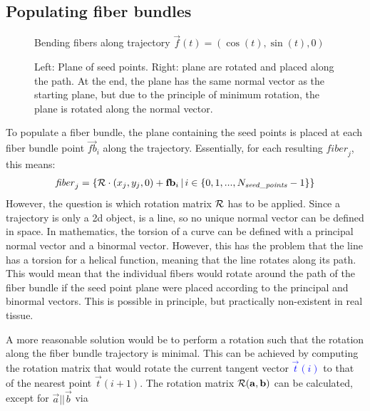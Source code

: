 \subsection{Populating fiber bundles}\label{sec:fillBundle}
%
\begin{figure}[!t]
    \centering
	\caption{Bending fibers along trajectory $\vec{f}(t) = \left(\cos(t), \sin(t), 0 \right)$ }
	\label{fig:bendingFiberBundle}
\end{figure}
%
\begin{figure}[!t]
    \centering
    \setlength{\tikzwidth}{0.75\textwidth}
	\caption[]{Left: Plane of seed points. Right: plane are rotated and placed along the path. At the end, the plane has the same normal vector as the starting plane, but due to the principle of minimum rotation, the plane is rotated along the normal vector.}
	\label{fig:torsion}
\end{figure}
%
To populate a fiber bundle, the plane containing the seed points is placed at each fiber bundle point $\vec{fb}_i$ along the trajectory.
Essentially, for each resulting $\mathit{fiber}_j$, this means:
% 
\begin{align}
    \mathit{fiber}_j = \left\{ \mathcal{R} \cdot (x_j, y_j, 0) + \mathbf{fb}_i \, | \, i \in \{0,1,...,N_{\mathit{seed\_points}}-1\}\right\}
\end{align}
% 
However, the question is which rotation matrix $\mathcal{R}$ has to be applied.
Since a trajectory is only a 2d object, \ie{} is a line, so no unique normal vector can be defined in space.
In mathematics, the torsion of a curve can be defined with a principal normal vector and a binormal vector.
However, this has the problem that the line has a torsion for a helical function, meaning that the line rotates along its path.
This would mean that the individual fibers would rotate around the path of the fiber bundle if the seed point plane were placed according to the principal and binormal vectors.
This is possible in principle, but practically non-existent in real tissue.
\par
% 
A more reasonable solution would be to perform a rotation such that the rotation along the fiber bundle trajectory is minimal.
This can be achieved by computing the rotation matrix that would rotate the current tangent vector \textcolor{BLUE}{$\vec{t}(i)$} to that of the nearest point $\vec{t}(i+1)$.
The rotation matrix $\mathcal{R}(\mathbf{a}, \mathbf{b})$ can be calculated, except for $\vec{a} || \vec{b}$ via
